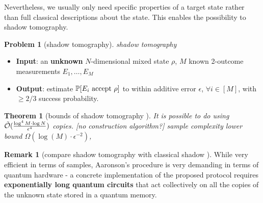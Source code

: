 \documentclass[
reprint,
aps,
pra,
]{revtex4-2}
\theoremstyle{plain}
\newtheorem{theorem}{Theorem}
\theoremstyle{definition}
\newtheorem{problem}{Problem}
\newtheorem{remark}{Remark}
\newcommand{\dm}{\rho}
\begin{document}
Nevertheless, we usually only need specific properties of a target state rather than full classical descriptions about the state.
This enables the possibility to shadow tomography.
\begin{problem}[shadow tomography]\label{prm:shadow_tomography}
	\emph{shadow tomography}
	\begin{itemize}
		\item \textbf{Input}: an \textbf{unknown} $N$-dimensional mixed state $\rho$, $M$ known 2-outcome measurements $E_1,\dots,E_M$
		\item \textbf{Output}: estimate $\probability[E_i \text{ accept } \dm]$ to within additive error $\epsilon$, $\forall i\in [M]$, with $\ge 2/3$ success probability.	
	\end{itemize}
\end{problem}
\begin{theorem}[bounds of shadow tomography \cite{aaronsonShadowTomographyQuantum2018}]\label{thm:shadow_tomography}
	It is possible to do  using $\tilde{\mathcal{O}}(\frac{\log^4 M\cdot \log N}{\epsilon^4})$ copies. [no construction algorithm?]
	sample complexity lower bound $\Omega(\log (M) \cdot \epsilon^{-2})$, 
\end{theorem}
\begin{remark}[compare shadow tomography with classical shadow \cite{huangPredictingManyProperties2020}]
	While very efficient in terms of samples, Aaronson's procedure is very demanding in terms of quantum hardware - a concrete implementation of the proposed protocol requires \textbf{exponentially long quantum circuits} that act collectively on all the copies of the unknown state stored in a quantum memory.
\end{remark}
\end{document}
